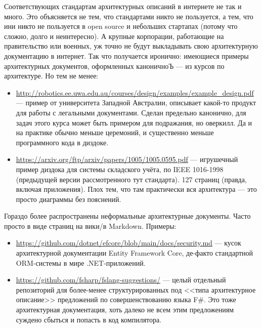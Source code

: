 \documentclass{../mcstext}
\begin{document}
Соответствующих стандартам архитектурных описаний в интернете не так и много. Это объясняется не тем, что стандартами никто не пользуется, а тем, что ини никто не пользуется в open source и небольших стартапах (потому что сложно, долго и неинтересно). А крупные корпорации, работающие на правительство или военных, уж точно не будут выкладывать свою архитектурную документацию в интернет. Так что получается иронично: имеющиеся примеры архитектурных документов, оформленных каноничноЪ --- из курсов по архитектуре. Но тем не менее:

\begin{itemize}
    \item \url{http://robotics.ee.uwa.edu.au/courses/design/examples/example_design.pdf} --- пример от университета Западной Австралии, описывает какой-то продукт для работы с легальными документами. Сделан предельно канонично, для задач этого курса может быть примером для подражания, но оверкилл. Да и на практике обычно меньше церемоний, и существенно меньше программного кода в диздоке.
    \item \url{https://arxiv.org/ftp/arxiv/papers/1005/1005.0595.pdf} --- игрушечный пример диздока для системы складского учёта, по IEEE 1016-1998 (предыдущей версии рассмотренного тут стандарта). 127 страниц (правда, включая приложения). Плох тем, что там практически вся архитектура --- это просто диаграммы без пояснений.
\end{itemize}

Гораздо более распространены неформальные архитектурные документы. Часто просто в виде страниц на вики/в Markdown. Примеры:

\begin{itemize}
    \item \url{https://github.com/dotnet/efcore/blob/main/docs/security.md} --- кусок архитектурной документации Entity Framework Core, де-факто стандартной ORM-системы в мире .NET-приложений.
    \item \url{https://github.com/fsharp/fslang-suggestions/} --- целый отдельный репозиторий для более-менее структурированных под <<типа архитектурное описание>> предложений по совершенствованию языка F\#. Это тоже архитектурная документация, хоть далеко не всем этим предложениям суждено сбыться и попасть в код компилятора.
\end{itemize}

\end{document}
